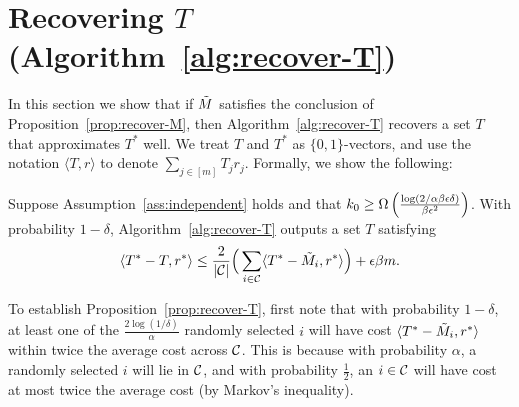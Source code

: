 \section{Recovering $T$ (Algorithm~\ref{alg:recover-T})}
\vskip -0.10in
\label{sec:approach-T}
\label{sec:rounding}

In this section we show that if $\tilde{M}$ satisfies the conclusion of 
Proposition~\ref{prop:recover-M}, then Algorithm~\ref{alg:recover-T} 
recovers a set $T$ that approximates $T^*$ well. We treat $T$ and $T^*$ 
as $\{0,1\}$-vectors, and use the notation $\langle T, r \rangle$ 
to denote $\sum_{j \in [m]} T_jr_j$. Formally, we show the following:
\begin{proposition}
\label{prop:recover-T}
Suppose Assumption~\ref{ass:independent} holds and that
$k_0 \geq \Omega\left( \frac{\log(2/\alpha\beta\epsilon\delta)}{\beta\epsilon^2} \right)$. 
With probability $1-\delta$, Algorithm~\ref{alg:recover-T} outputs a set $T$ satisfying 
\begin{equation}
\label{eq:recover-T}
\langle T^* - T, r^* \rangle  \leq \frac{2}{|\mathcal{C}|}\Big(\sum_{i \in \mathcal{C}} \langle T^* - \tilde{M}_{i}, r^* \rangle\Big) + \epsilon\beta m.
\end{equation}
\end{proposition}
To establish Proposition~\ref{prop:recover-T}, 
first note that with probability $1-\delta$, 
at least one of the $\frac{2\log(1/\delta)}{\alpha}$ randomly selected 
$i$ will have cost $\langle T^* - \tilde{M}_i, r^* \rangle$ 
within twice the average cost across $\mathcal{C}$. This 
is because with probability $\alpha$, a randomly selected 
$i$ will lie in $\mathcal{C}$, and with probability $\frac{1}{2}$, 
an $i \in \mathcal{C}$ will have cost at 
most twice the average cost (by Markov's inequality).

